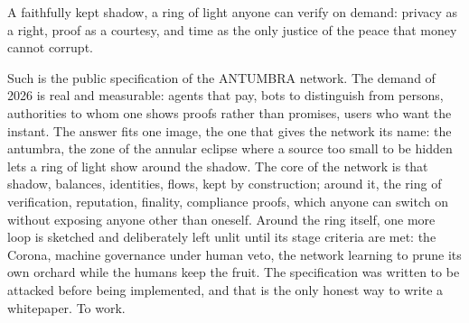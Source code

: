 A faithfully kept shadow, a ring of light anyone can verify on demand:
privacy as a right, proof as a courtesy, and time as the only justice
of the peace that money cannot corrupt.

Such is the public specification of the ANTUMBRA network. The demand of
2026 is real and measurable: agents that pay, bots to distinguish from
persons, authorities to whom one shows proofs rather than promises,
users who want the instant. The answer fits one image, the one that
gives the network its name: the antumbra, the zone of the annular
eclipse where a source too small to be hidden lets a ring of light show
around the shadow. The core of the network is that shadow, balances,
identities, flows, kept by construction; around it, the ring of
verification, reputation, finality, compliance proofs, which anyone can
switch on without exposing anyone other than oneself. Around the ring
itself, one more loop is sketched and deliberately left unlit until its
stage criteria are met: the Corona, machine governance under human
veto, the network learning to prune its own orchard while the humans
keep the fruit. The specification was written to be attacked before
being implemented, and that is the only honest way to write a
whitepaper. To work.

